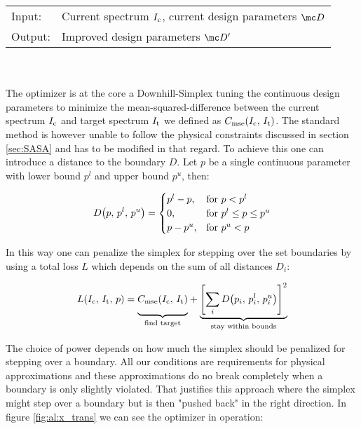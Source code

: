 \begin{tabular}{ll}
    \toprule
    Input: &
    Current spectrum $I_{\mathrm{c}}$, 
    current design parameters $\mc D$\\
    Output: & 
    Improved design parameters $\mc D'$\\
    \bottomrule
\end{tabular}
\\
\\
The optimizer is at the core a Downhill-Simplex \cite{Nelder1965} tuning the continuous design parameters to minimize the mean-squared-difference between the current spectrum $I_{\mathrm{c}}$ and target spectrum $I_{\mathrm{t}}$ we defined as 
$C_{\mathrm{mse}}\qty(I_{\mathrm{c}}, \, I_{\mathrm{t}})$.
The standard method is however unable to follow the physical constraints discussed in section \ref{sec:SASA} and has to be modified in that regard. To achieve this one can introduce a distance to the boundary $D$. Let $p$ be a single continuous parameter with lower bound $p^l$ and upper bound $p^u$, then:

\begin{equation}
    D\qty(p, \, p^l, \, p^u) =
    \begin{cases}
        p^l - p, & \text{for } p < p^l\\
        0, & \text{for } p^l \leq p \leq p^u\\
        p - p^u, & \text{for } p^u < p
    \end{cases}
\end{equation}

\noindent
In this way one can penalize the simplex for stepping over the set boundaries by using a total loss $L$ which depends on the sum of all distances $D_i$:

\begin{equation}
    L(I_\s{c}, \,I_\s{t}, \,p) =
    {\underbrace{%
    \vphantom{ \left(\frac{a^{0.3}}{b}\right) }
    C_\s{mse}(I_\s{c}, \, I_\s{t})}_{\text{find target}}}
    +
    {\underbrace{%
    \qty[\sum_i D\qty(p_i, \, p_i^l, \, p_i^u)]^2
    }_{\text{stay within bounds}}}\\
\end{equation}

The choice of power depends on how much the simplex should be penalized for stepping over a boundary. All our conditions are requirements for physical approximations and these approximations do no break completely when a boundary is only slightly violated. That justifies this approach where the simplex might step over a boundary but is then "pushed back" in the right direction. In figure \ref{fig:al:x_trans} we can see the optimizer in operation:

